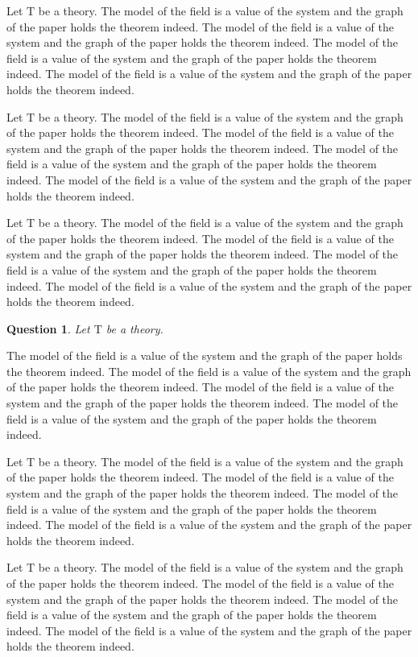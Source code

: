 \documentclass{article}
\begin{document}
\newcommand{\T}{{\mathrm{T}}}
\newtheorem*{q}{Question}
\newtheorem*{rem}{Remark}

Let $\T$ be a theory.
The model of the field is a value of the system and the graph of the paper holds the theorem indeed. The model of the field is a value of the system and the graph of the paper holds the theorem indeed. The model of the field is a value of the system and the graph of the paper holds the theorem indeed. The model of the field is a value of the system and the graph of the paper holds the theorem indeed.

Let $\T$ be a theory.
The model of the field is a value of the system and the graph of the paper holds the theorem indeed. The model of the field is a value of the system and the graph of the paper holds the theorem indeed. The model of the field is a value of the system and the graph of the paper holds the theorem indeed. The model of the field is a value of the system and the graph of the paper holds the theorem indeed.

Let $\T$ be a theory.
The model of the field is a value of the system and the graph of the paper holds the theorem indeed. The model of the field is a value of the system and the graph of the paper holds the theorem indeed. The model of the field is a value of the system and the graph of the paper holds the theorem indeed. The model of the field is a value of the system and the graph of the paper holds the theorem indeed.

\begin{q}Let $\T$ be a theory.\end{q}
The model of the field is a value of the system and the graph of the paper holds the theorem indeed. The model of the field is a value of the system and the graph of the paper holds the theorem indeed. The model of the field is a value of the system and the graph of the paper holds the theorem indeed. The model of the field is a value of the system and the graph of the paper holds the theorem indeed.

Let $\T$ be a theory.
The model of the field is a value of the system and the graph of the paper holds the theorem indeed. The model of the field is a value of the system and the graph of the paper holds the theorem indeed. The model of the field is a value of the system and the graph of the paper holds the theorem indeed. The model of the field is a value of the system and the graph of the paper holds the theorem indeed.

Let $\T$ be a theory.
The model of the field is a value of the system and the graph of the paper holds the theorem indeed. The model of the field is a value of the system and the graph of the paper holds the theorem indeed. The model of the field is a value of the system and the graph of the paper holds the theorem indeed. The model of the field is a value of the system and the graph of the paper holds the theorem indeed.
\end{document}
